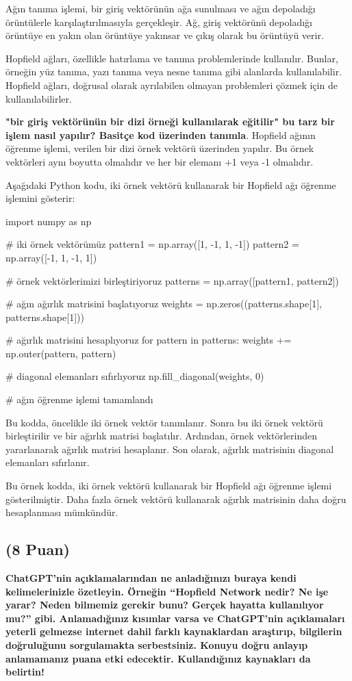 \documentclass[11pt]{article}
\begin{document}
Ağın tanıma işlemi, bir giriş vektörünün ağa sunulması ve ağın depoladığı örüntülerle karşılaştırılmasıyla gerçekleşir. Ağ, giriş vektörünü depoladığı örüntüye en yakın olan örüntüye yakınsar ve çıkış olarak bu örüntüyü verir.

Hopfield ağları, özellikle hatırlama ve tanıma problemlerinde kullanılır. Bunlar, örneğin yüz tanıma, yazı tanıma veya nesne tanıma gibi alanlarda kullanılabilir. Hopfield ağları, doğrusal olarak ayrılabilen olmayan problemleri çözmek için de kullanılabilirler.

\textbf{"bir giriş vektörünün bir dizi örneği kullanılarak eğitilir" bu tarz bir işlem nasıl yapılır? Basitçe kod üzerinden tanımla}.
Hopfield ağının öğrenme işlemi, verilen bir dizi örnek vektörü üzerinden yapılır. Bu örnek vektörleri aynı boyutta olmalıdır ve her bir elemanı +1 veya -1 olmalıdır.

Aşağıdaki Python kodu, iki örnek vektörü kullanarak bir Hopfield ağı öğrenme işlemini gösterir:
\begin{python}
    
import numpy as np

# iki örnek vektörümüz
pattern1 = np.array([1, -1, 1, -1])
pattern2 = np.array([-1, 1, -1, 1])

# örnek vektörlerimizi birleştiriyoruz
patterns = np.array([pattern1, pattern2])

# ağın ağırlık matrisini başlatıyoruz
weights = np.zeros((patterns.shape[1], patterns.shape[1]))

# ağırlık matrisini hesaplıyoruz
for pattern in patterns:
    weights += np.outer(pattern, pattern)

# diagonal elemanları sıfırlıyoruz
np.fill_diagonal(weights, 0)

# ağın öğrenme işlemi tamamlandı
\end{python}
Bu kodda, öncelikle iki örnek vektör tanımlanır. Sonra bu iki örnek vektörü birleştirilir ve bir ağırlık matrisi başlatılır. Ardından, örnek vektörlerinden yararlanarak ağırlık matrisi hesaplanır. Son olarak, ağırlık matrisinin diagonal elemanları sıfırlanır.

Bu örnek kodda, iki örnek vektörü kullanarak bir Hopfield ağı öğrenme işlemi gösterilmiştir. Daha fazla örnek vektörü kullanarak ağırlık matrisinin daha doğru hesaplanması mümkündür.

\subsection{(8 Puan)} \textbf{ChatGPT’nin açıklamalarından ne anladığınızı buraya kendi kelimelerinizle özetleyin. Örneğin ``Hopfield Network nedir? Ne işe yarar? Neden bilmemiz gerekir bunu? Gerçek hayatta kullanılıyor mu?'' gibi. Anlamadığınız kısımlar varsa ve ChatGPT’nin açıklamaları yeterli gelmezse internet dahil farklı kaynaklardan araştırıp, bilgilerin doğruluğunu sorgulamakta serbestsiniz. Konuyu doğru anlayıp anlamamanız puana etki edecektir. Kullandığınız kaynakları da belirtin!}
\end{document}
